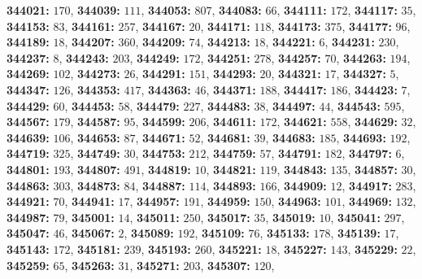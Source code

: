 \textsf{\bfseries 344021:} $170$, \textsf{\bfseries 344039:} $111$, \textsf{\bfseries 344053:} $807$, \textsf{\bfseries 344083:} $66$, \textsf{\bfseries 344111:} $172$, \textsf{\bfseries 344117:} $35$, \textsf{\bfseries 344153:} $83$, \textsf{\bfseries 344161:} $257$, \textsf{\bfseries 344167:} $20$, \textsf{\bfseries 344171:} $118$, \textsf{\bfseries 344173:} $375$, \textsf{\bfseries 344177:} $96$, \textsf{\bfseries 344189:} $18$, \textsf{\bfseries 344207:} $360$, \textsf{\bfseries 344209:} $74$, \textsf{\bfseries 344213:} $18$, \textsf{\bfseries 344221:} $6$, \textsf{\bfseries 344231:} $230$, \textsf{\bfseries 344237:} $8$, \textsf{\bfseries 344243:} $203$, \textsf{\bfseries 344249:} $172$, \textsf{\bfseries 344251:} $278$, \textsf{\bfseries 344257:} $70$, \textsf{\bfseries 344263:} $194$, \textsf{\bfseries 344269:} $102$, \textsf{\bfseries 344273:} $26$, \textsf{\bfseries 344291:} $151$, \textsf{\bfseries 344293:} $20$, \textsf{\bfseries 344321:} $17$, \textsf{\bfseries 344327:} $5$, \textsf{\bfseries 344347:} $126$, \textsf{\bfseries 344353:} $417$, \textsf{\bfseries 344363:} $46$, \textsf{\bfseries 344371:} $188$, \textsf{\bfseries 344417:} $186$, \textsf{\bfseries 344423:} $7$, \textsf{\bfseries 344429:} $60$, \textsf{\bfseries 344453:} $58$, \textsf{\bfseries 344479:} $227$, \textsf{\bfseries 344483:} $38$, \textsf{\bfseries 344497:} $44$, \textsf{\bfseries 344543:} $595$, \textsf{\bfseries 344567:} $179$, \textsf{\bfseries 344587:} $95$, \textsf{\bfseries 344599:} $206$, \textsf{\bfseries 344611:} $172$, \textsf{\bfseries 344621:} $558$, \textsf{\bfseries 344629:} $32$, \textsf{\bfseries 344639:} $106$, \textsf{\bfseries 344653:} $87$, \textsf{\bfseries 344671:} $52$, \textsf{\bfseries 344681:} $39$, \textsf{\bfseries 344683:} $185$, \textsf{\bfseries 344693:} $192$, \textsf{\bfseries 344719:} $325$, \textsf{\bfseries 344749:} $30$, \textsf{\bfseries 344753:} $212$, \textsf{\bfseries 344759:} $57$, \textsf{\bfseries 344791:} $182$, \textsf{\bfseries 344797:} $6$, \textsf{\bfseries 344801:} $193$, \textsf{\bfseries 344807:} $491$, \textsf{\bfseries 344819:} $10$, \textsf{\bfseries 344821:} $119$, \textsf{\bfseries 344843:} $135$, \textsf{\bfseries 344857:} $30$, \textsf{\bfseries 344863:} $303$, \textsf{\bfseries 344873:} $84$, \textsf{\bfseries 344887:} $114$, \textsf{\bfseries 344893:} $166$, \textsf{\bfseries 344909:} $12$, \textsf{\bfseries 344917:} $283$, \textsf{\bfseries 344921:} $70$, \textsf{\bfseries 344941:} $17$, \textsf{\bfseries 344957:} $191$, \textsf{\bfseries 344959:} $150$, \textsf{\bfseries 344963:} $101$, \textsf{\bfseries 344969:} $132$, \textsf{\bfseries 344987:} $79$, \textsf{\bfseries 345001:} $14$, \textsf{\bfseries 345011:} $250$, \textsf{\bfseries 345017:} $35$, \textsf{\bfseries 345019:} $10$, \textsf{\bfseries 345041:} $297$, \textsf{\bfseries 345047:} $46$, \textsf{\bfseries 345067:} $2$, \textsf{\bfseries 345089:} $192$, \textsf{\bfseries 345109:} $76$, \textsf{\bfseries 345133:} $178$, \textsf{\bfseries 345139:} $17$, \textsf{\bfseries 345143:} $172$, \textsf{\bfseries 345181:} $239$, \textsf{\bfseries 345193:} $260$, \textsf{\bfseries 345221:} $18$, \textsf{\bfseries 345227:} $143$, \textsf{\bfseries 345229:} $22$, \textsf{\bfseries 345259:} $65$, \textsf{\bfseries 345263:} $31$, \textsf{\bfseries 345271:} $203$, \textsf{\bfseries 345307:} $120$, 

